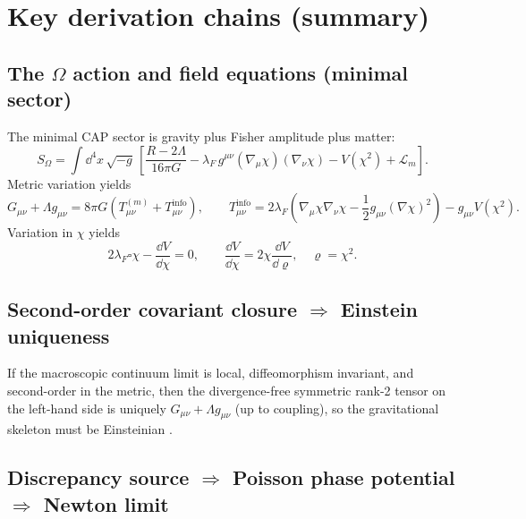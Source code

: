 \section{Key derivation chains (summary)}
\label{app:chains}

\subsection{The \texorpdfstring{$\Omega$}{Omega} action and field equations (minimal sector)}

The minimal CAP sector is gravity plus Fisher amplitude plus matter:
\begin{equation}
  S_{\Omega}
  =\int \dd^{4}x\,\sqrt{-g}\,
  \left[
    \frac{R-2\Lambda}{16\pi G}
    -\lambda_{F}\, g^{\mu\nu}(\nabla_{\mu}\chi)(\nabla_{\nu}\chi)
    -V(\chi^{2})
    +\mathcal{L}_{m}
  \right].
\end{equation}
Metric variation yields
\begin{equation}
  G_{\mu\nu}+\Lambda g_{\mu\nu}=8\pi G\left(T_{\mu\nu}^{(m)}+T_{\mu\nu}^{\mathrm{info}}\right),
  \qquad
  T^{\mathrm{info}}_{\mu\nu}
  = 2\lambda_{F}\left(\nabla_{\mu}\chi\nabla_{\nu}\chi-\frac12 g_{\mu\nu}(\nabla\chi)^2\right)
  -g_{\mu\nu}V(\chi^2).
\end{equation}
Variation in $\chi$ yields
\begin{equation}
  2\lambda_{F}\square\chi-\frac{\dd V}{\dd\chi}=0,
  \qquad
  \frac{\dd V}{\dd\chi}=2\chi\frac{\dd V}{\dd\varrho},\quad \varrho=\chi^2.
\end{equation}

\subsection{Second-order covariant closure \texorpdfstring{$\Rightarrow$}{=>} Einstein uniqueness}

If the macroscopic continuum limit is local, diffeomorphism invariant, and second-order in the metric, then the divergence-free symmetric rank-2 tensor on the left-hand side is uniquely $G_{\mu\nu}+\Lambda g_{\mu\nu}$ (up to coupling), so the gravitational skeleton must be Einsteinian \cite{Lovelock1971}.

\subsection{Discrepancy source \texorpdfstring{$\Rightarrow$}{=>} Poisson phase potential \texorpdfstring{$\Rightarrow$}{=>} Newton limit}

